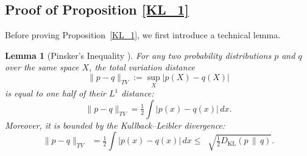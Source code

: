 \documentclass{article} %
\newtheorem{lemma}[theorem]{Lemma}
\begin{document}
\subsection{Proof of Proposition \ref{KL_1}}
\label{claim:information_error_bound}
Before proving Proposition~\ref{KL_1}, we first introduce a technical lemma.

\begin{lemma}[Pinsker's Inequality \citep{yeung2008information}] \label{lemma:Pinsker}
For any two probability distributions $p$ and $q$ over the same space $X$, the total variation distance
\[
\| p - q \|_{TV} := \sup_{X} |p(X) - q(X)|
\]
is equal to one half of their $L^1$ distance:
\[
\| p - q \|_{TV}  = \tfrac{1}{2} \int |p(x) - q(x)| \, dx .
\]
Moreover, it is bounded by the Kullback--Leibler divergence:
\[
\| p - q \|_{TV}  \;\; = \tfrac{1}{2} \int |p(x) - q(x)| \, dx  \le \;\; \sqrt{\tfrac{1}{2} D_{\mathrm{KL}}(p \,\|\, q)} .
\]
\end{lemma}
\end{document}
